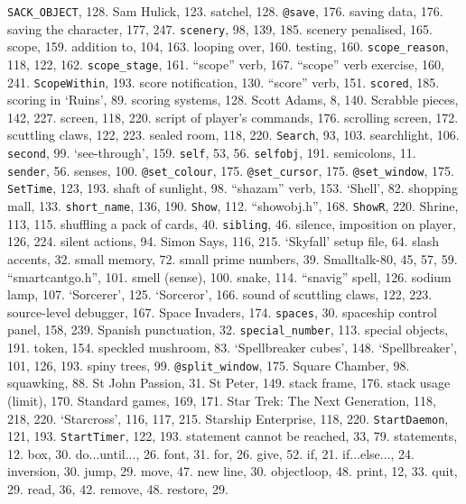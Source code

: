 {{\tt SACK\_OBJECT}}, 128.
Sam Hulick, 123.
satchel, 128.
{{\tt @save}}, 176.
saving data, 176.
saving the character, 177, 247.
{{\tt scenery}}, 98, 139, 185.
scenery penalised, 165.
scope, 159.
\quad  addition to, 104, 163.
\quad  looping over, 160.
\quad  testing, 160.
{{\tt scope\_reason}}, 118, 122, 162.
{{\tt scope\_stage}}, 161.
``scope'' verb, 167.
``scope'' verb exercise, 160, 241.
{{\tt ScopeWithin}}, 193.
score notification, 130.
``score'' verb, 151.
{{\tt scored}}, 185.
scoring in `Ruins', 89.
scoring systems, 128.
Scott Adams, 8, 140.
Scrabble pieces, 142, 227.
screen, 118, 220.
script of player's commands, 176.
scrolling screen, 172.
scuttling claws, 122, 223.
sealed room, 118, 220.
{{\tt Search}}, 93, 103.
searchlight, 106.
{{\tt second}}, 99.
`see-through', 159.
{{\tt self}}, 53, 56.
{{\tt selfobj}}, 191.
semicolons, 11.
{{\tt sender}}, 56.
senses, 100.
{{\tt @set\_colour}}, 175.
{{\tt @set\_cursor}}, 175.
{{\tt @set\_window}}, 175.
{{\tt SetTime}}, 123, 193.
shaft of sunlight, 98.
``shazam'' verb, 153.
`Shell', 82.
shopping mall, 133.
{{\tt short\_name}}, 136, 190.
{{\tt Show}}, 112.
``showobj.h'', 168.
{{\tt ShowR}}, 220.
Shrine, 113, 115.
shuffling a pack of cards, 40.
{{\tt sibling}}, 46.
silence, imposition on player, 126, 224.
silent actions, 94.
Simon Says, 116, 215.
`Skyfall' setup file, 64.
slash accents, 32.
small memory, 72.
small prime numbers, 39.
Smalltalk-80, 45, 57, 59.
``smartcantgo.h'', 101.
smell (sense), 100.
snake, 114.
``snavig'' spell, 126.
sodium lamp, 107.
`Sorcerer', 125.
`Sorceror', 166.
sound of scuttling claws, 122, 223.
source-level debugger, 167.
Space Invaders, 174.
{{\tt spaces}}, 30.
spaceship control panel, 158, 239.
Spanish punctuation, 32.
{{\tt special\_number}}, 113.
special objects, 191.
 token, 154.
speckled mushroom, 83.
`Spellbreaker cubes', 148.
`Spellbreaker', 101, 126, 193.
spiny trees, 99.
{{\tt @split\_window}}, 175.
Square Chamber, 98.
squawking, 88.
St John Passion, 31.
St Peter, 149.
stack frame, 176.
stack usage (limit), 170.
Standard games, 169, 171.
Star Trek: The Next Generation, 118, 218, 220.
`Starcross', 116, 117, 215.
Starship Enterprise, 118, 220.
{{\tt StartDaemon}}, 121, 193.
{{\tt StartTimer}}, 122, 193.
statement cannot be reached, 33, 79.
statements, 12.
\quad  box, 30.
\quad  do...until..., 26.
\quad  font, 31.
\quad  for, 26.
\quad  give, 52.
\quad  if, 21.
\quad  if...else..., 24.
\quad  inversion, 30.
\quad  jump, 29.
\quad  move, 47.
\quad  new line, 30.
\quad  objectloop, 48.
\quad  print, 12, 33.
\quad  quit, 29.
\quad  read, 36, 42.
\quad  remove, 48.
\quad  restore, 29.
